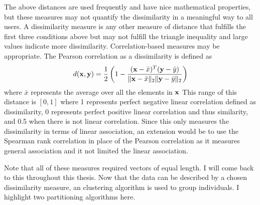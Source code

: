 The above distances are used frequently and have nice mathematical properties, but these measures may not quantify the dissimilarity in a meaningful way to all users. A dissimilarity measure is any other measure of distance that fulfills the first three conditions above but may not fulfill the triangle inequality and large values indicate more dissimilarity. Correlation-based measures may be appropriate. The Pearson correlation as a dissimilarity is defined as
$$d(\mathbf x,\mathbf y) = \frac{1}{2}\left(1 - \frac{(\mathbf x - \bar{x})^{T}(\mathbf y - \bar{y})}{\|\mathbf x - \bar{x}\|_{2}\|\mathbf y - \bar{y}\|_{2}}\right)$$
where $\bar{x}$ represents the average over all the elements in $\mathbf x$ This range of this distance is $[0,1]$ where 1 represents perfect negative linear correlation defined as dissimilarity, 0 represents perfect positive linear correlation and thus similarity, and 0.5 when there is not linear correlation. Since this only measures the dissimilarity in terms of linear association, an extension would be to use the Spearman rank correlation in place of the Pearson correlation as it measures general association and it not limited the linear association.

Note that all of these measures required vectors of equal length. I will come back to this throughout this thesis. Now that the data can be described by a chosen dissimilarity measure, an clustering algorithm is used to group individuals. I highlight two partitioning algorithms here.
